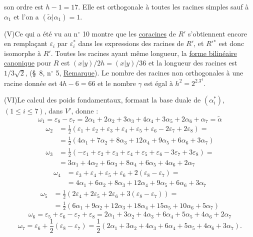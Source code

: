 son ordre est $h-1=17$. Elle est orthogonale à toutes les racines simples
sauf à $\alpha_1$ et l'on a $(\tilde\alpha|\alpha_1)=1$.

(V)\quad Ce qui a été vu au n$^\circ$ 10 montre que les \uline{coracines} de $R'$
s'obtiennent encore en remplaçant $\varepsilon_i$ par $\varepsilon_i^*$
dans les expressions des racines de $R'$, et $R'{}^*$ est donc isomorphe à $R'$.
Toutes les racines ayant même longueur, la \uline{forme bilinéaire canonique}
pour $R$ est $(x|y)/2h=(x|y)/36$ et la longueur des racines est
$1/3\sqrt2$, (\S\ 8, n$^\circ$ 5, \uline{Remarque}).
Le nombre des racines non orthogonales à une racine donnée est
$4h-6=66$ et le nombre $\gamma$ est égal à $h^2=2^2.3^4$.

(VI)\quad Le calcul des poids fondamentaux, formant la base duale de
$(\alpha_i^*)$, $(1\leq i\leq7)$, dans $V'$, donne :
\[
\omega_1=\varepsilon_8-\varepsilon_7
=2\alpha_1+2\alpha_2+3\alpha_3+4\alpha_4+3\alpha_5+2\alpha_6+\alpha_7
=\tilde\alpha
\]
\[
\begin{aligned}
\omega_2&=\frac12(\varepsilon_1+\varepsilon_2+\varepsilon_3+\varepsilon_4+
\varepsilon_5+\varepsilon_6-2\varepsilon_7+2\varepsilon_8)=\\
&=\frac12(4\alpha_1+7\alpha_2+8\alpha_3+12\alpha_4+9\alpha_5+6\alpha_6+3\alpha_7)
\end{aligned}
\]
\[
\begin{aligned}
\omega_3&=\frac12(-\varepsilon_1+\varepsilon_2+\varepsilon_3+\varepsilon_4+
\varepsilon_5+\varepsilon_6-3\varepsilon_7+3\varepsilon_8)=\\
&=3\alpha_1+4\alpha_2+6\alpha_3+8\alpha_4+6\alpha_5+4\alpha_6+2\alpha_7
\end{aligned}
\]
\[
\begin{aligned}
\omega_4&=\varepsilon_3+\varepsilon_4+\varepsilon_5+\varepsilon_6+
2(\varepsilon_8-\varepsilon_7)=\\
&=4\alpha_1+6\alpha_2+8\alpha_3+12\alpha_4+9\alpha_5+6\alpha_6+3\alpha_7
\end{aligned}
\]
\[
\begin{aligned}
\omega_5&=\frac12(2\varepsilon_4+2\varepsilon_5+2\varepsilon_6+
3(\varepsilon_8-\varepsilon_7))=\\
&=\frac12(6\alpha_1+9\alpha_2+12\alpha_3+18\alpha_4+15\alpha_5+10\alpha_6+5\alpha_7)
\end{aligned}
\]
\[
\omega_6=\varepsilon_5+\varepsilon_6-\varepsilon_7+\varepsilon_8
=2\alpha_1+3\alpha_2+4\alpha_3+6\alpha_4+5\alpha_5+4\alpha_6+2\alpha_7
\]
\[
\omega_7=\varepsilon_6+\frac12(\varepsilon_8-\varepsilon_7)
=\frac12(2\alpha_1+3\alpha_2+4\alpha_3+6\alpha_4+5\alpha_5+4\alpha_6+3\alpha_7).
\]

